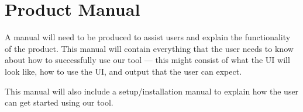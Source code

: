 \section{Product Manual}
A manual will need to be produced to assist users and explain the functionality of the product. This manual will contain everything that the user needs to know about how to successfully use our tool --- this might consist of what the UI will look like, how to use the UI, and output that the user can expect. 

This manual will also include a setup/installation manual to explain how the user can get started using our tool.

